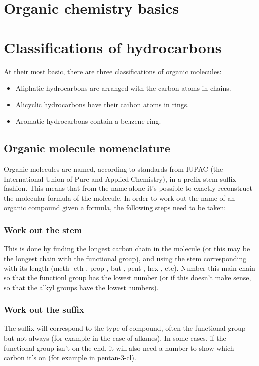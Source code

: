 \section{Organic chemistry basics}
\section{Classifications of hydrocarbons}
At their most basic, there are three classifications of organic molecules:
\begin{itemize}
	\item Aliphatic hydrocarbons are arranged with the carbon atoms in chains.
	\item Alicyclic hydrocarbons have their carbon atoms in rings.
	\item Aromatic hydrocarbons contain a benzene ring.
\end{itemize}
\subsection{Organic molecule nomenclature}
Organic molecules are named, according to standards from IUPAC (the International Union of Pure and Applied Chemistry), in a prefix-stem-suffix fashion. This means that from the name alone it's possible to exactly reconstruct the molecular formula of the molecule. In order to work out the name of an organic compound given a formula, the following steps need to be taken:

\subsubsection{Work out the stem}
This is done by finding the longest carbon chain in the molecule (or this may be the longest chain with the functional group), and using the stem corresponding with its length (meth- eth-, prop-, but-, pent-, hex-, etc). Number this main chain so that the functionl group has the lowest number (or if this doesn't make sense, so that the alkyl groups have the lowest numbers).

\subsubsection{Work out the suffix}
The suffix will correspond to the type of compound, often the functional group but not always (for example in the case of alkanes). In some cases, if the functional group isn't on the end, it will also need a number to show which carbon it's on (for example in pentan-3-ol).

